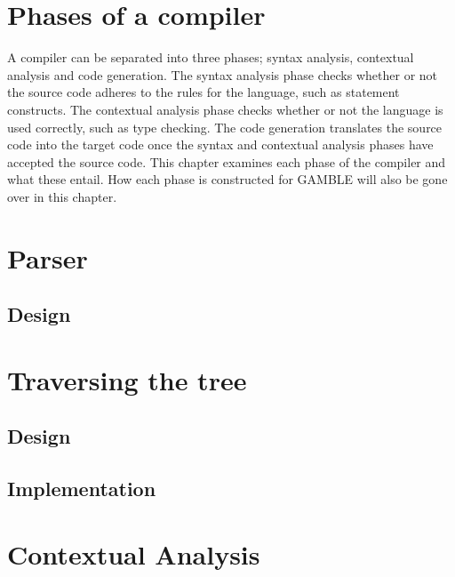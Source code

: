 \chapter{Phases of a compiler}
A compiler can be separated into three phases; syntax analysis, contextual analysis and code generation.
The syntax analysis phase checks whether or not the source code adheres to the rules for the language, such as statement constructs.
The contextual analysis phase checks whether or not the language is used correctly, such as type checking.
The code generation translates the source code into the target code once the syntax and contextual analysis phases have accepted the source code.
This chapter examines each phase of the compiler and what these entail.
How each phase is constructed for GAMBLE will also be gone over in this chapter. %

\chapter{Parser}
\section{Design}






\chapter{Traversing the tree}
\section{Design}


\section{Implementation}

\chapter{Contextual Analysis}



